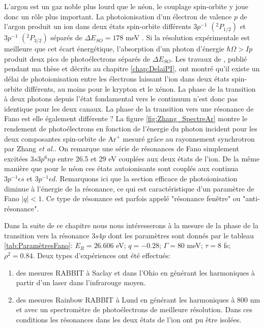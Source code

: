 L'argon est un gaz noble plus lourd que le néon, le couplage spin-orbite y joue donc un rôle plus important. La photoionisation d'un électron de valence $p$ de l'argon produit un ion dans deux états spin-orbite différents $3p^{-1}$ $(^{2}P_{1/2})$ et $3p^{-1}$ $(^{2}P_{3/2})$ séparés de $\Delta E_{SO} = 178$ meV . Si la résolution expérimentale est meilleure que cet écart énergétique, l'absorption d'un photon d'énergie $\hbar \Omega > Ip$ produit deux pics de photoélectrons séparés de $\Delta E_{SO}$. Les travaux de , publié pendant ma thèse et décrits au chapitre \ref{chap:DelaiPI}, ont montré qu'il existe un délai de photoionisation entre les électrons laissant l'ion dans deux états spin-orbite différents, au moins pour le krypton et le xénon. La phase de la transition à deux photons depuis l'état fondamental vers le continuum n'est donc pas identique pour les deux canaux. La phase de la transition vers une résonance de Fano est elle également différente ? La figure \ref{fig:Zhang_SpectreAr} montre le rendement de photoélectrons en fonction de l'énergie du photon incident pour les deux composantes spin-orbite de Ar$^+$ mesuré grâce au rayonnement synchrotron par Zhang \textit{et al.}. On remarque une série de résonances de Fano simplement excitées $3s3p^{6}np$ entre 26.5 et 29 eV couplées aux deux états de l'ion. De la même manière que pour le néon ces états autoionisants sont couplés aux continua $3p^{-1} \epsilon s$ et $3p^{-1} \epsilon d$. Remarquons ici que la section efficace de photoionisation diminue à l'énergie de la résonance, ce qui est caractéristique d'un paramètre de Fano $|q| < 1$. Ce type de résonance est parfois appelé "résonance fenêtre" ou "anti-résonance".

Dans la suite de ce chapitre nous nous intéresserons à la mesure de la phase de la transition vers la résonance $3s4p$ dont les paramètres sont donnés par le tableau \ref{tab:ParamètresFano}: $E_R = 26.606$ eV; $q = -0.28$; $\Gamma =  80$ meV; $\tau = 8$ fs; $\rho^2 = 0.84$. Deux types d'expériences ont été effectués:
\begin{enumerate}
\item des mesures RABBIT à Saclay et dans l'Ohio en générant les harmoniques à partir d'un laser dans l'infrarouge moyen.
\item des mesures Rainbow RABBIT à Lund en générant les harmoniques à 800 nm et avec un spectromètre de photoélectrons de meilleure résolution. Dans ces conditions les résonances dans les deux états de l'ion ont pu être isolées.
\end{enumerate}

